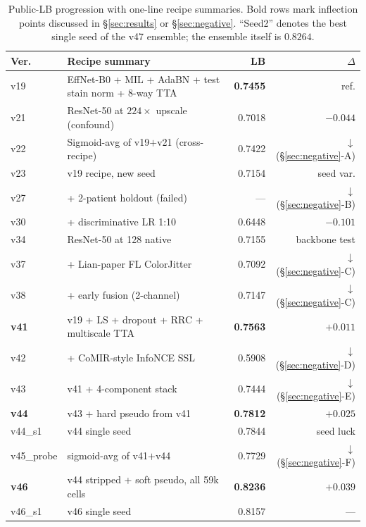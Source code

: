 \documentclass[conference]{IEEEtran}
\begin{document}
\begin{table}[!t]
  \centering
  \caption{Public-LB progression with one-line recipe summaries. Bold rows mark inflection points discussed in \S\ref{sec:results} or \S\ref{sec:negative}. ``Seed2'' denotes the best single seed of the v47 ensemble; the ensemble itself is $0.8264$.}
  \label{tab:progression}
  \footnotesize
  \begin{tabular}{@{}lp{8.5cm}rr@{}}
    \toprule
    Ver. & Recipe summary & LB & $\Delta$ \\
    \midrule
    v19 & EffNet-B0 + MIL + AdaBN + test stain norm + 8-way TTA & \textbf{0.7455} & ref. \\
    v21 & ResNet-50 at $224\times$ upscale (confound) & 0.7018 & $-0.044$ \\
    v22 & Sigmoid-avg of v19$+$v21 (cross-recipe) & 0.7422 & $\downarrow$ (\S\ref{sec:negative}-A) \\
    v23 & v19 recipe, new seed & 0.7154 & seed var. \\
    v27 & + 2-patient holdout (failed) & --- & $\downarrow$ (\S\ref{sec:negative}-B) \\
    v30 & + discriminative LR 1:10 & 0.6448 & $-0.101$ \\
    v34 & ResNet-50 at 128 native & 0.7155 & backbone test \\
    v37 & + Lian-paper FL ColorJitter & 0.7092 & $\downarrow$ (\S\ref{sec:negative}-C) \\
    v38 & + early fusion (2-channel) & 0.7147 & $\downarrow$ (\S\ref{sec:negative}-C) \\
    \textbf{v41} & v19 + LS + dropout + RRC + multiscale TTA & \textbf{0.7563} & $\mathbf{+0.011}$ \\
    v42 & + CoMIR-style InfoNCE SSL & 0.5908 & $\downarrow$ (\S\ref{sec:negative}-D) \\
    v43 & v41 + 4-component stack & 0.7444 & $\downarrow$ (\S\ref{sec:negative}-E) \\
    \textbf{v44} & v43 + hard pseudo from v41 & \textbf{0.7812} & $\mathbf{+0.025}$ \\
    v44\_s1 & v44 single seed & 0.7844 & seed luck \\
    v45\_probe & sigmoid-avg of v41$+$v44 & 0.7729 & $\downarrow$ (\S\ref{sec:negative}-F) \\
    \textbf{v46} & v44 stripped + soft pseudo, all 59k cells & \textbf{0.8236} & $\mathbf{+0.039}$ \\
    v46\_s1 & v46 single seed & 0.8157 & --- \\

\end{tabular}
\end{table}
\end{document}

